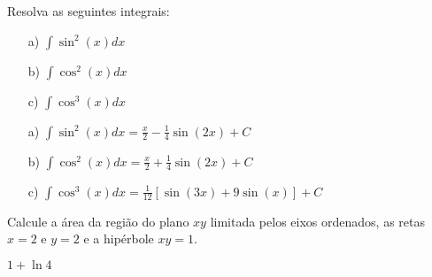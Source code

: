 \begin{exer}Resolva as seguintes integrais:
\begin{itemize}
\item[a)] $\int \sin^2(x)dx$
\item[b)] $\int \cos^2(x)dx$
\item[c)] $\int \cos^3(x)dx$
\end{itemize}
\end{exer}
\begin{resp}
    \begin{itemize}
        \item[a)] $\int \sin^2(x)dx=\frac{x}{2}-\frac{1}{4}\sin(2x)+C$
        \item[b)] $\int \cos^2(x)dx=\frac{x}{2}+\frac{1}{4}\sin(2x)+C$
        \item[c)] $\int \cos^3(x)dx=\frac{1}{12}\left[\sin(3x)+9\sin(x)\right]+C$
 \end{itemize}
        
\end{resp}


\begin{exer}Calcule a área da região do plano $xy$ limitada pelos eixos ordenados, as retas $x=2$ e $y=2$ e a hipérbole $xy=1$.
\end{exer}
\begin{resp}
$1+\ln4$ 
\end{resp}


